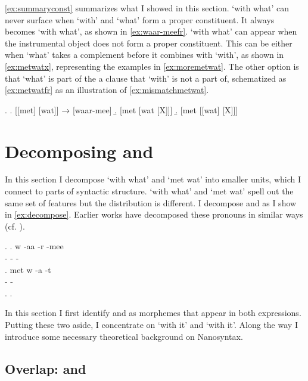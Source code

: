 \documentclass[12pt]{article}
\begin{document}
\ref{ex:summaryconst} summarizes what I showed in this section.  `with what' can never surface when  `with' and  `what' form a proper constituent. It always becomes  `with what', as shown in \ref{ex:waar-meefr}.  `with what' can appear when the instrumental object does not form a proper constituent.
This can be either when  `what' takes a complement before it combines with  `with', as shown in \ref{ex:metwatx}, representing the examples in \ref{ex:moremetwat}. The other option is that  `what' is part of the a clause that  `with' is not a part of, schematized as \ref{ex:metwatfr} as an illustration of \ref{ex:mismatchmetwat}.

\ex.\label{ex:summaryconst}
\a. [[met] [wat]] → [waar-mee]\label{ex:waar-meefr}
\b. [met [wat [X]]]\label{ex:metwatx}
\b. [met [[wat] [X]]]\label{ex:metwatfr}


\section{Decomposing  and }\label{sec:takingapart}

In this section I decompose  `with what' and  `met wat' into smaller units, which I connect to parts of syntactic structure.  `with what' and  `met wat' spell out the same set of features but the distribution is different. I decompose  and  as I show in \ref{ex:decompose}. Earlier works have decomposed these pronouns in similar ways (cf. \citealt{hachem2015,noonan2017dutch,wesseling2018}).

\ex.\label{ex:decompose}
\ag. w -aa -r -mee\\
 - - -\\
\bg. met w -a -t\\
  - -\\
\z.
\z.

In this section I first identify  and  as morphemes that appear in both expressions. Putting these two aside, I concentrate on  `with it' and  `with it'. Along the way I introduce some necessary theoretical background on Nanosyntax.

\subsection{Overlap:  and }
\end{document}
